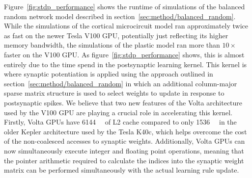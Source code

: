\documentclass[utf8]{frontiersSCNS} %
\begin{document}
Figure~\ref{fig:stdp_performance} shows the runtime of simulations of the balanced random network model described in section~\ref{sec:method/balanced_random}.
While the simulations of the cortical microcircuit model ran approximately twice as fast on the newer Tesla V100 GPU, potentially just reflecting its higher memory bandwidth, the simulations of the plastic model ran more than $10\times$ faster on the V100 GPU.
As figure~\ref{fig:stdp_performance} shows, this is almost entirely due to the time spend in the postsynaptic learning kernel.
This kernel is where synaptic potentiation is applied using the approach outlined in section~\ref{sec:method/balanced_random} in which an additional column-major sparse matrix structure is used to select weights to update in response to postsynaptic spikes.
We believe that two new features of the Volta architecture~\citep{Nvidia2017} used by the V100 GPU are playing a crucial role in accelerating this kernel.
Firstly, Volta GPUs have \SI{6144}{\kibi\byte} of L2 cache compared to only \SI{1536}{\kibi\byte} in the older Kepler architecture used by the Tesla K40c, which helps overcome the cost of the non-coalesced accesses to synaptic weights.
Additionally, Volta GPUs can now simultaneously execute integer and floating point operations, meaning that the pointer arithmetic required to calculate the indices into the synaptic weight matrix can be performed simultaneously with the actual learning rule update.
\end{document}
